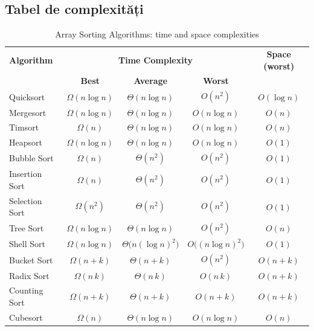 \documentclass[11pt,a4paper]{article}
\theoremstyle{definition}
\theoremstyle{plain}
\theoremstyle{remark}
\begin{document}
\subsection{Tabel de complexități}
\begin{table}[h]
  \centering
  \begin{tabular}{l c c c c}
    \toprule
    \textbf{Algorithm}
      & \multicolumn{3}{c}{\textbf{Time Complexity}}
      & \textbf{Space (worst)} \\
    \cmidrule(lr){2-4}
      & \textbf{Best} & \textbf{Average} & \textbf{Worst} & \\
    \midrule
    Quicksort     & $\Omega(n\log n)$ & $\Theta(n\log n)$ & $O(n^2)$      & $O(\log n)$     \\
    Mergesort     & $\Omega(n\log n)$ & $\Theta(n\log n)$ & $O(n\log n)$  & $O(n)$          \\
    Timsort       & $\Omega(n)$       & $\Theta(n\log n)$ & $O(n\log n)$  & $O(n)$          \\
    Heapsort      & $\Omega(n\log n)$ & $\Theta(n\log n)$ & $O(n\log n)$  & $O(1)$          \\
    Bubble Sort   & $\Omega(n)$       & $\Theta(n^2)$     & $O(n^2)$      & $O(1)$          \\
    Insertion Sort& $\Omega(n)$       & $\Theta(n^2)$     & $O(n^2)$      & $O(1)$          \\
    Selection Sort& $\Omega(n^2)$     & $\Theta(n^2)$     & $O(n^2)$      & $O(1)$          \\
    Tree Sort     & $\Omega(n\log n)$ & $\Theta(n\log n)$ & $O(n^2)$      & $O(n)$          \\
    Shell Sort    & $\Omega(n\log n)$ & $\Theta\bigl(n(\log n)^2\bigr)$ & $O\bigl((n\log n)^2\bigr)$ & $O(1)$ \\
    Bucket Sort   & $\Omega(n + k)$   & $\Theta(n + k)$   & $O(n^2)$      & $O(n + k)$      \\
    Radix Sort    & $\Omega(n\,k)$    & $\Theta(n\,k)$    & $O(n\,k)$     & $O(n + k)$      \\
    Counting Sort & $\Omega(n + k)$   & $\Theta(n + k)$   & $O(n + k)$    & $O(n + k)$      \\
    Cubesort      & $\Omega(n)$       & $\Theta(n\log n)$ & $O(n\log n)$  & $O(n)$          \\
    \bottomrule
  \end{tabular}
  \caption{Array Sorting Algorithms: time and space complexities}
  \label{tab:sorting}
\end{table}
\end{document}
